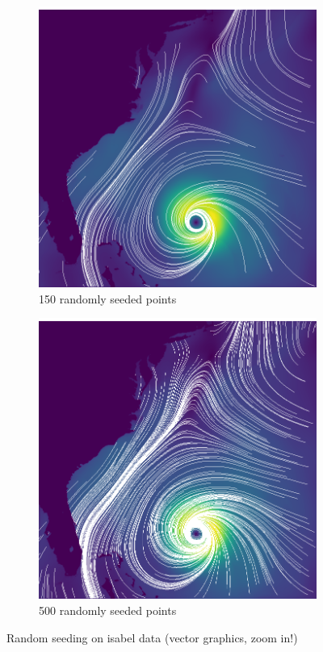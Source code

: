 \documentclass{article}
\begin{document}
\begin{figure}[h!]
    \centering
    \begin{subfigure}{0.65\textwidth}
        \centering
        \includegraphics[width=\textwidth]{isabel_random_150.eps}
        \caption{150 randomly seeded points}
    \end{subfigure}
    \hfill
    \hfill
    \begin{subfigure}{0.65\textwidth}
        \centering
        \includegraphics[width=\textwidth]{isabel_random_500.eps}
        \caption{500 randomly seeded points}
    \end{subfigure}
    \caption{Random seeding on isabel data (vector graphics, zoom in!)}
\end{figure}
\end{document}

